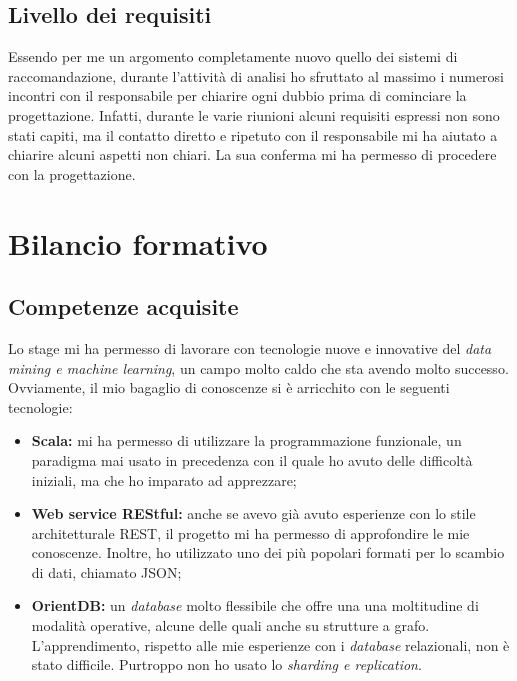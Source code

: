 \subsection{Livello dei requisiti}
Essendo per me un argomento completamente nuovo quello dei sistemi di raccomandazione, durante l'attività di analisi ho sfruttato al massimo i numerosi incontri con il responsabile per chiarire ogni dubbio prima di cominciare la progettazione. Infatti, durante le varie riunioni alcuni requisiti espressi non sono stati capiti, ma il contatto diretto e ripetuto con il responsabile mi ha aiutato a chiarire alcuni aspetti non chiari. La sua conferma mi ha permesso di procedere con la progettazione.



\section{Bilancio formativo}

\subsection{Competenze acquisite}
Lo stage mi ha permesso di lavorare con tecnologie nuove e innovative del \textit{data mining e machine learning}, un campo molto caldo che sta avendo molto successo. Ovviamente, il mio bagaglio di conoscenze si è arricchito con le seguenti tecnologie:
\begin{itemize}
	\item \textbf{Scala:} mi ha permesso di utilizzare la programmazione funzionale, un paradigma mai usato in precedenza con il quale ho avuto delle difficoltà iniziali, ma che ho imparato ad apprezzare;
	\item \textbf{Web service REStful:} anche se avevo già avuto esperienze con lo stile architetturale \gls{REST}, il progetto mi ha permesso di approfondire le mie conoscenze. Inoltre, ho utilizzato uno dei più popolari formati per lo scambio di dati, chiamato \gls{JSON};
	\item \textbf{OrientDB:} un \textit{database} molto flessibile che offre una una moltitudine di modalità operative, alcune delle quali anche su strutture a grafo. L'apprendimento, rispetto alle mie esperienze con i \textit{database} relazionali, non è stato difficile. Purtroppo non ho usato lo \textit{sharding e replication}.
\end{itemize}

